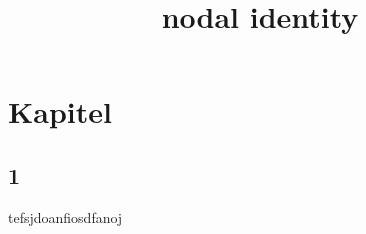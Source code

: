 \documentclass[12pt,a4paper]{book}
\title{nodal identity}
\begin{document}
\maketitle
\chapter{Kapitel}
\section{1}
tefsjdoanfiosdfanoj
\end{document}
